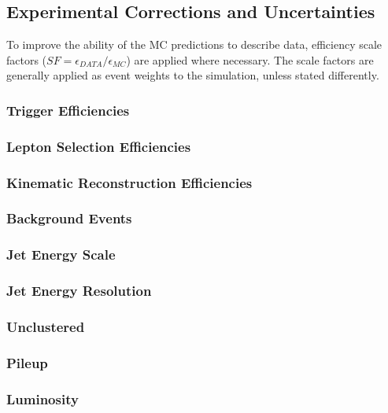 \subsection{Experimental Corrections and Uncertainties}
To improve the ability of the MC predictions to describe data, efficiency scale factors ($SF=\epsilon_{DATA}/\epsilon_{MC}$) are applied where necessary. The scale factors are generally applied as event weights to the simulation, unless stated differently.

\subsubsection{Trigger Efficiencies}
\label{sec:trigEff}

\subsubsection{Lepton Selection Efficiencies}
\label{sec:lepEff}

\subsubsection{Kinematic Reconstruction Efficiencies}
\label{sec:kinrecoEff}

\subsubsection{Background Events}
\label{sec:bgEvts}

\subsubsection{Jet Energy Scale}
\label{sec:JES}

\subsubsection{Jet Energy Resolution}
\label{sec:JER}

\subsubsection{Unclustered \ETmiss}
\label{sec:unclusteredMET}

\subsubsection{Pileup}
\label{sec:PU}

\subsubsection{Luminosity}
\label{sec:lumi}

